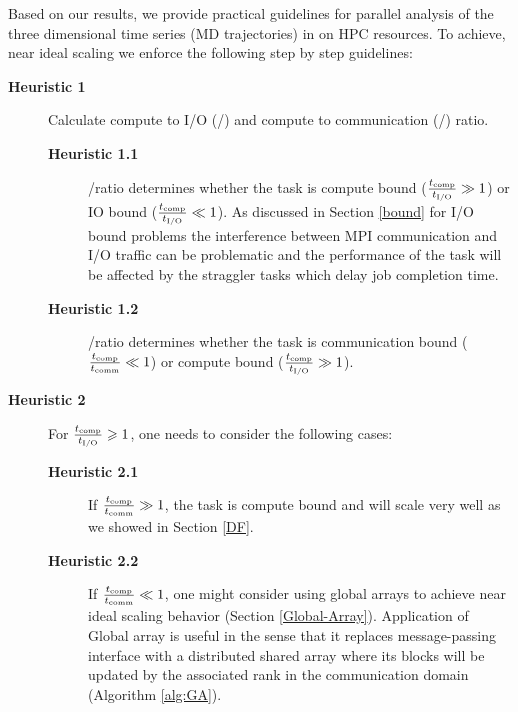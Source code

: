 \label{guideline}
Based on our results, we provide practical guidelines for parallel analysis of the three dimensional time series (MD trajectories) in  on HPC resources.
To achieve, near ideal scaling we enforce the following step by step guidelines:

\begin{description}
  \item[\textbf{Heuristic 1}] Calculate compute to I/O (\tcomp/\tIO) and compute to communication (\tcomp/\tcomm) ratio. 
  \begin{description}
  \item[\textbf{Heuristic 1.1}] \tcomp/\tIO ratio determines whether the task is compute bound ($\frac{{t}_{\text{comp}}}{{t}_{\text{I/O}}} \gg 1$) or IO bound ($\frac{{t}_{\text{comp}}}{{t}_{\text{I/O}}} \ll 1$). 
  As discussed in Section \ref{bound} for I/O bound problems the interference between MPI communication and I/O traffic can be problematic \cite{VMD2013, Kevin2018} and the performance of the task will be affected by the straggler tasks which delay job completion time.  
  \item[\textbf{Heuristic 1.2}] \tcomp/\tcomm ratio determines whether the task is communication bound ($\frac{{t}_{\text{comp}}}{t_{\text{comm}}} \ll 1$) or compute bound ($\frac{{t}_{\text{comp}}}{{t}_{\text{I/O}}} \gg 1$).
  \end{description}
  
  \item[\textbf{Heuristic 2}] For $\frac{{t}_{\text{comp}}}{{t}_{\text{I/O}}} \geqslant 1$, one needs to consider the following cases: 
  \begin{description}
  \item[\textbf{Heuristic 2.1}] If $\frac{{t}_{\text{comp}}}{t_{\text{comm}}} \gg 1$, the task is compute bound and will scale very well as we showed in Section \ref{DF}.
  \item[\textbf{Heuristic 2.2}] If $\frac{{t}_{\text{comp}}}{t_{\text{comm}}} \ll 1$, one might consider using global arrays to achieve near ideal scaling behavior (Section \ref{Global-Array}). 
  Application of Global array is useful in the sense that it replaces message-passing interface with a distributed shared array where its 
  blocks will be updated by the associated rank in the communication domain (Algorithm \ref{alg:GA}). 
  \end{description}
  

\end{description}
